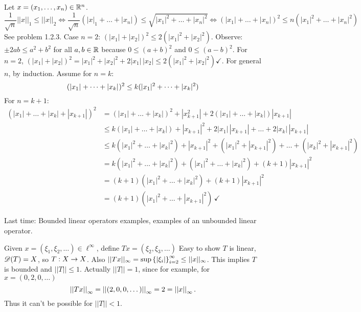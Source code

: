 \documentclass[]{article}
\begin{document}
Let $x=(x_1,\dots,x_n)\in\mathbb{R}^n$.
$$\frac1{\sqrt n} ||x||_1 \leq ||x||_2 \iff \frac1{\sqrt n}(|x|_1+\dots+|x_n|)\leq\sqrt{|x_1|^2+\dots+|x_n|^2} \iff (|x_1|+\dots+|x_n|)^2 \leq n(|x_1|^2 + \dots + |x_n|^2) $$
See problem 1.2.3.
Case $n=2$: $(|x_1|+|x_2|)^2\leq2(|x_1|^2+|x_2|^2)$.
Observe: $\pm 2ab\leq a^2+b^2$ for all $a,b\in\mathbb{R}$ because $0\leq (a+b)^2$ and $0\leq(a-b)^2$.
For $n=2$, $(|x_1|+|x_2|)^2 = |x_1|^2+|x_2|^2+2|x_1|\,|x_2| \leq 2(|x_1|^2+|x_2|^2) \checkmark$.
For general $n$, by induction.
Assume for $n=k$:
$$(|x_1|^{}+\dots+|x_{k}|^{})^2\leq k(|x_1|^2+\dots+|x_k|^2)$$
For $n=k+1$:
\begin{align*}
	(|x_1|+\dots+|x_k|+|x_{k+1}|)^2 &= (|x_1|+\dots+|x_k|)^2 + |x_{k+1}^2| + 2(|x_1|+\dots+|x_k|)|x_{k+1}| \\
									&\leq k(|x_1|+\dots+|x_k|)+|x_{k+1}|^2 + 2|x_1|\,|x_{k+1}| + \dots + 2|x_k|\,|x_{k+1}| \\
									&\leq k(|x_1|^2+\dots+|x_k|^2)+|x_{k+1}|^2+(|x_1|^2+|x_{k+1}|^2)+\dots+(|x_k|^2+|x_{k+1}|^2) \\
									&= k(|x_1|^2+\dots+|x_k|^2)+(|x_1|^2+\dots+|x_k|^2) + (k+1)|x_{k+1}|^2 \\
									&= (k+1)(|x_1|^2+\dots+|x_k|^2) + (k+1)|x_{k+1}|^2 \\
									&= (k+1)(|x_1|^2+\dots+|x_{k+1}|^2)\,\checkmark
\end{align*}

Last time: Bounded linear operators examples, examples of an unbounded linear operator.

\begin{example}
	[$X=\ell^\infty$ with $||\cdot||_\infty$]
	Given $x=(\xi_1,\xi_2,\dots)\in\ell^\infty$, define $Tx = (\xi_2,\xi_3,\dots)$ 
	Easy to show $T$ is linear, $\mathscr{D}(T)=X$, so $T:X\rightarrow X$.
	Also $||Tx||_\infty = \sup\left\{ |\xi_i| \right\}_{i=2}^\infty\leq||x||_\infty$.
	This implies $T$ is bounded and $||T||\leq1$.
	Actually $||T||=1$, since for example, for $x=(0,2,0,\dots)$
	$$\left|\left|Tx\right|\right|_{\infty} = \left|\left|(2,0,0,\dots)\right|\right|_{\infty} = 2 = \left|\left|x\right|\right|_{\infty}.$$
	Thus it can't be possible for $||T||<1$.
\end{example}
\end{document}
